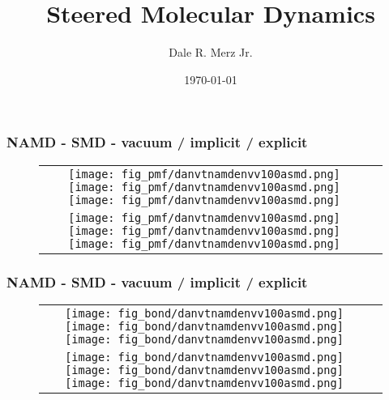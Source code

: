 \documentclass[9pt]{beamer} %
\title[]{Steered Molecular Dynamics}
\author{Dale R. Merz Jr.}
\institute[Ga Tech]
{ Georgia Institute of Technology \\
  \medskip {\emph{dmerz3@gatech.edu}} }
\date{\today}
\begin{document}
\begin{frame}
\frametitle{NAMD - SMD - vacuum / implicit / explicit}
{}
\begin{figure}
\begin{tabular}{cc}
\hspace*{-1cm}
\texttt{[image: fig\_pmf/danvtnamdenvv100asmd.png]}
\texttt{[image: fig\_pmf/danvtnamdenvv100asmd.png]}
\texttt{[image: fig\_pmf/danvtnamdenvv100asmd.png]} \\
\hspace*{-1cm}
\texttt{[image: fig\_pmf/danvtnamdenvv100asmd.png]}
\texttt{[image: fig\_pmf/danvtnamdenvv100asmd.png]}
\texttt{[image: fig\_pmf/danvtnamdenvv100asmd.png]} \\
\end{tabular}
\end{figure}
\end{frame}
\begin{frame}
\frametitle{NAMD - SMD - vacuum / implicit / explicit}
{}
\begin{figure}
\begin{tabular}{cc}
\hspace*{-1cm}
\texttt{[image: fig\_bond/danvtnamdenvv100asmd.png]}
\texttt{[image: fig\_bond/danvtnamdenvv100asmd.png]}
\texttt{[image: fig\_bond/danvtnamdenvv100asmd.png]} \\
\hspace*{-1cm}
\texttt{[image: fig\_bond/danvtnamdenvv100asmd.png]}
\texttt{[image: fig\_bond/danvtnamdenvv100asmd.png]}
\texttt{[image: fig\_bond/danvtnamdenvv100asmd.png]} \\
\end{tabular}
\end{figure}
\end{frame}
%
% 
\end{document}
